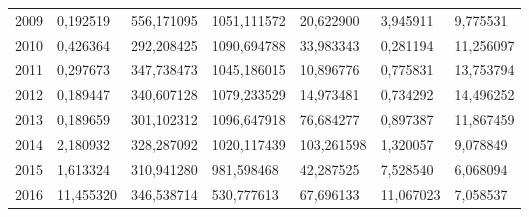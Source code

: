 \begin{table}
\begin{tabular}{p{1cm}p{2cm}p{2cm}p{2cm}p{2cm}p{2cm}p{2cm}}
 2009 &     0,192519 &   556,171095 &                                        1051,111572 &                           20,622900 &                       3,945911 &                         9,775531 \\
 2010 &     0,426364 &   292,208425 &                                        1090,694788 &                           33,983343 &                       0,281194 &                        11,256097 \\
 2011 &     0,297673 &   347,738473 &                                        1045,186015 &                           10,896776 &                       0,775831 &                        13,753794 \\
 2012 &     0,189447 &   340,607128 &                                        1079,233529 &                           14,973481 &                       0,734292 &                        14,496252 \\
 2013 &     0,189659 &   301,102312 &                                        1096,647918 &                           76,684277 &                       0,897387 &                        11,867459 \\
 2014 &     2,180932 &   328,287092 &                                        1020,117439 &                          103,261598 &                       1,320057 &                         9,078849 \\
 2015 &     1,613324 &   310,941280 &                                         981,598468 &                           42,287525 &                       7,528540 &                         6,068094 \\
 2016 &    11,455320 &   346,538714 &                                         530,777613 &                           67,696133 &                      11,067023 &                         7,058537 \\
\bottomrule
\end{tabular}
\end{table}
